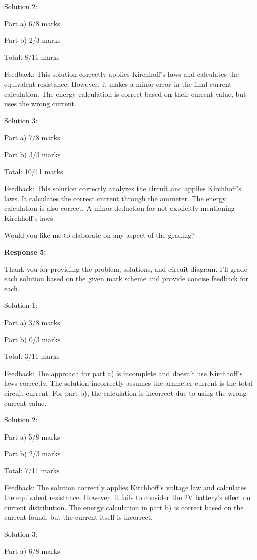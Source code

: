 \documentclass[a4paper,11pt]{article}
\begin{document}
Solution 2:

Part a) 6/8 marks

Part b) 2/3 marks

Total: 8/11 marks

Feedback: This solution correctly applies Kirchhoff's laws and calculates the equivalent resistance. However, it makes a minor error in the final current calculation. The energy calculation is correct based on their current value, but uses the wrong current.

Solution 3:

Part a) 7/8 marks

Part b) 3/3 marks

Total: 10/11 marks

Feedback: This solution correctly analyzes the circuit and applies Kirchhoff's laws. It calculates the correct current through the ammeter. The energy calculation is also correct. A minor deduction for not explicitly mentioning Kirchhoff's laws.

Would you like me to elaborate on any aspect of the grading?

\bigskip
\textbf{Response 5:}

Thank you for providing the problem, solutions, and circuit diagram. I'll grade each solution based on the given mark scheme and provide concise feedback for each.

Solution 1:

Part a) 3/8 marks

Part b) 0/3 marks

Total: 3/11 marks

Feedback: The approach for part a) is incomplete and doesn't use Kirchhoff's laws correctly. The solution incorrectly assumes the ammeter current is the total circuit current. For part b), the calculation is incorrect due to using the wrong current value.

Solution 2:

Part a) 5/8 marks

Part b) 2/3 marks

Total: 7/11 marks

Feedback: The solution correctly applies Kirchhoff's voltage law and calculates the equivalent resistance. However, it fails to consider the 2V battery's effect on current distribution. The energy calculation in part b) is correct based on the current found, but the current itself is incorrect.

Solution 3:

Part a) 6/8 marks
\end{document}
